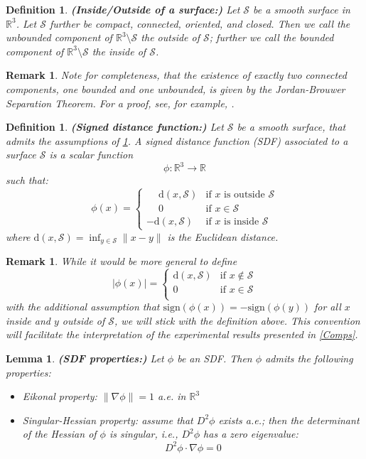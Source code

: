 \documentclass[12pt,openany]{book}
\newcommand{\R}{\mathbb{R}}
\def\S{\mathcal{S}}
\theoremstyle{plainnormal}
\newtheorem{lemma}[theorem]{Lemma}
\newtheorem{definition}[theorem]{Definition}
\newtheorem{remark}[theorem]{Remark}
\theoremstyle{remark}
\begin{document}
\begin{definition}\label{defInsOuts}\textbf{(Inside/Outside of a surface:)}
    Let $\S$ be a smooth surface in $\R^3$. Let $\S$ further be compact, connected, oriented, and closed. Then we call the unbounded component of $\R^3\setminus \S$ the \emph{outside} of $\S$; further we call the bounded component of $\R^3\setminus \S$ the \emph{inside} of $\S$.
\end{definition}
\begin{remark}
    Note for completeness, that the existence of exactly two connected components, one bounded and one unbounded, is given by the \emph{Jordan-Brouwer Separation Theorem}. For a proof, see, for example, \cite{Lima01011988}. 
\end{remark}
\begin{definition}\textbf{(Signed distance function:)}
    Let $\S$ be a smooth surface, that admits the assumptions of \cref{defInsOuts}. A \emph{signed distance function} (SDF) associated to a surface $\S$ is a scalar function 
    $$\phi: \R^3 \rightarrow \R$$
    such that:
    $$\phi(x) = 
\begin{cases}
\phantom{-}\mathrm{d}(x, \S) & \text{if } x \text{ is outside } \S \\
\phantom{-} 0 & \text{if } x \in \S \\
-\mathrm{d}(x, \S) & \text{if } x \text{ is inside } \S
\end{cases} $$
    where $\mathrm{d} (x, \S)= \inf_{y\in \S} \|x - y\|$ is the Euclidean distance.
\end{definition}
    \begin{remark}
        While it would be more general to define
    $$|\phi(x)| = 
\begin{cases}
\mathrm{d}(x, \S) & \text{if } x \notin \S \\
0 & \text{if } x \in \S \\
\end{cases}$$
with the additional assumption that 
$\mathrm{sign}(\phi(x)) = - \mathrm{sign}(\phi (y))$ for all $x$ inside and $y$ outside of $\S$, we will stick with the definition above. This convention will facilitate the interpretation of the experimental results presented in \cref{Comps}.
    \end{remark}
\begin{lemma}\label{singHess} \textbf{(SDF properties:)}
    Let $\phi$ be an SDF. Then $\phi$ admits the following properties:
    \begin{itemize}
        \item \emph{Eikonal property}:  $\|\nabla \phi\| = 1 $ a.e. in $\R^3$ 
        \item \emph{Singular-Hessian property:} assume that $D^2\phi$ exists a.e.; then the determinant of the Hessian of $\phi$ is singular, i.e.,  $D^2 \phi$ has a zero eigenvalue:
        $$D^2 \phi \cdot\nabla \phi = 0$$
    
    \end{itemize}
\end{lemma}
\end{document}
